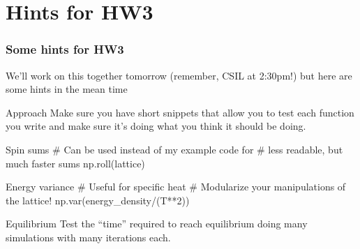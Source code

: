 \documentclass[hyperref={colorlinks=true}]{beamer}
\begin{document}
\section[Hints for HW3]{Hints for HW3}

\begin{frame}[fragile,shrink=15]
  \frametitle{Some hints for HW3}

  We'll work on this together tomorrow (remember, CSIL at 2:30pm!) but here are some hints in the mean time
  
  \vspace{0.3cm}
  
  \begin{ucblock}{Approach}
    Make sure you have short snippets that allow you to test each function you write and make sure it's doing what you think it should be doing. 
  \end{ucblock}
  
  \begin{ucpythonblock}{Spin sums}
     # Can be used instead of my example code for 
     # less readable, but much faster sums
     np.roll(lattice) 
  \end{ucpythonblock}
  
  \begin{ucpythonblock}{Energy variance}
     # Useful for specific heat 
     # Modularize your manipulations of the lattice!
     np.var(energy_density/(T**2))
  \end{ucpythonblock}
  
  \begin{ucblock}{Equilibrium}
    Test the ``time'' required to reach equilibrium  doing many simulations with many iterations each.
  \end{ucblock}
  
\end{frame}



%

%
%
%  

\end{document}
